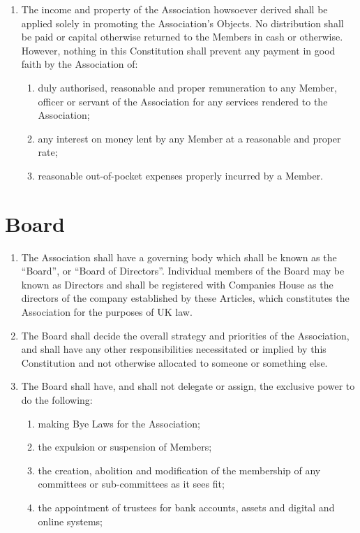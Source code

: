 \documentclass[10pt]{mk-articles-of-association}
\newcommand{\mysection}[1]{
  \end{enumerate}
  \section*{#1}
  \begin{enumerate}[resume]
}
\newcommand{\EC}[0]{Board}
\newcommand{\Exec}[0]{\EC{} }
\begin{document}
\begin{enumerate}
\item
  The income and property of the Association howsoever derived shall be
  applied solely in promoting the Association’s Objects. No distribution shall
  be paid or capital otherwise returned to the Members in cash or otherwise.
  However, nothing in this Constitution shall prevent any payment in good
  faith by the Association of:
  \begin{enumerate}
  \item duly authorised, reasonable and proper remuneration to any Member,
    officer or servant of the Association for any services rendered to the
    Association;
  \item any interest on money lent by any Member at a reasonable and proper
    rate; \ITor
  \item reasonable out-of-pocket expenses properly incurred by a Member.
  \end{enumerate}



\mysection{\Exec}

  \item The Association shall have a governing body which shall be
    known as the ``\EC{}'', or ``Board of Directors''. Individual
    members of the \Exec may be known as Directors and shall be
    registered with Companies House as the directors of the company
    established by these Articles, which constitutes the Association
    for the purposes of UK law.

  \item The \Exec shall decide the overall strategy and priorities of
    the Association, and shall have any other responsibilities
    necessitated or implied by this Constitution and not otherwise
    allocated to someone or something else.

  \item The \Exec shall have, and
    shall not delegate or assign, the exclusive power to do the
    following:\label{nondelegation}

    \begin{enumerate}
      \item making Bye Laws for the Association;

      \item the expulsion or suspension of Members;

      \item the creation, abolition and modification of the membership of
        any committees or sub-committees as it sees fit;

      \item the appointment of trustees for bank accounts, assets and
        digital and online systems; \ITand


\end{enumerate}
\end{enumerate}
\end{document}
